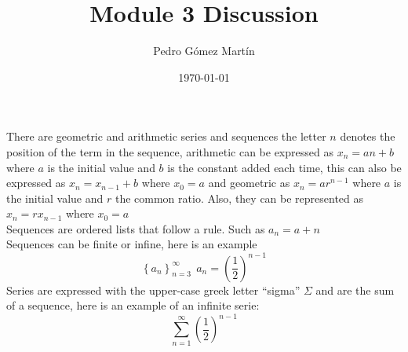 \documentclass{article}
\title{Module 3 Discussion}
\author{Pedro G\'{o}mez Mart\'{i}n}
\date{\today}
\begin{document}
\maketitle
There are geometric and arithmetic series and sequences the letter $n$ denotes the position of the term in the sequence, arithmetic can be expressed as $x_{n}=an+b$ where $a$ is the initial value and $b$ is the constant added each time, this can also be expressed as $x_{n}=x_{n-1}+b$ where $x_{0}=a$
and geometric as $x_{n}=ar^{n-1}$ where $a$ is the initial value and $r$ the common ratio. Also, they can be represented as $x_{n}=rx_{n-1}$ where $x_{0}=a$
\\
Sequences are ordered lists that follow a rule. Such as $a_{n}=a+n$ \\
Sequences can be finite or infine, here is an example
\begin{equation*}
\left\lbrace a_{n}\right\rbrace ^{\infty}_{n=3} \ \ a_{n}=\left( \frac{1}{2} \right)^{n-1}
\end{equation*}
Series are expressed with the upper-case greek letter ``sigma'' $\Sigma$ and are the sum of a sequence, here is an example of an infinite serie:
\begin{equation*}
\sum_{n=1}^{\infty}{\left( \frac{1}{2} \right)^{n-1}}
\end{equation*}
\end{document}
